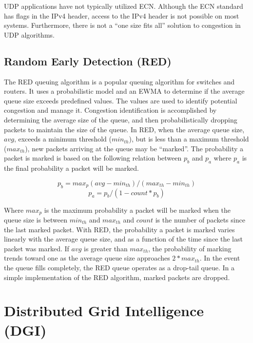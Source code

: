 UDP applications have not typically utilized \ac{ECN}.
Although the \ac{ECN} standard has flags in the IPv4 header, access to the IPv4 header is not possible on most systems.
Furthermore, there is not a ``one size fits all'' solution to congestion in UDP algorithms.

\subsection{Random Early Detection (RED)}
The \ac{RED} queuing algorithm is a popular queuing algorithm for switches and routers.
It uses a probabilistic model and an \ac{EWMA} to determine if the average queue size exceeds predefined values.
The values are used to identify potential congestion and manage it.
Congestion identification is accomplished by determining the average size of the queue, and then probabilistically dropping packets to maintain the size of the queue.
In \ac{RED}, when the average queue size, $avg$, exceeds a minimum threshold ($min_{th}$), but is less than a maximum threshold ($max_{th}$), new packets arriving at the queue may be ``marked''.
The probability a packet is marked is based on the following relation between $p_{b}$ and $p_{a}$ where $p_{a}$ is the final probability a packet will be marked.

\begin{equation}
p_{b} = max_p (avg - min_{th}) / (max_{th}-min_{th})
\end{equation}
\begin{equation}
p_{a} = p_{b} / (1-count * p_b)
\end{equation}

Where $max_p$ is the maximum probability a packet will be marked when the queue size is between $min_{th}$ and $max_{th}$ and $count$ is the number of packets since the last marked packet.
With \ac{RED}, the probability a packet is marked varies linearly with the average queue size, and as a function of the time since the last packet was marked.
If $avg$ is greater than $max_{th}$, the probability of marking trends toward one as the average queue size approaches $2*max_{th}$.
In the event the queue fills completely, the \ac{RED} queue operates as a drop-tail queue.
In a simple implementation of the \ac{RED} algorithm, marked packets are dropped.

\section{Distributed Grid Intelligence (DGI)}

